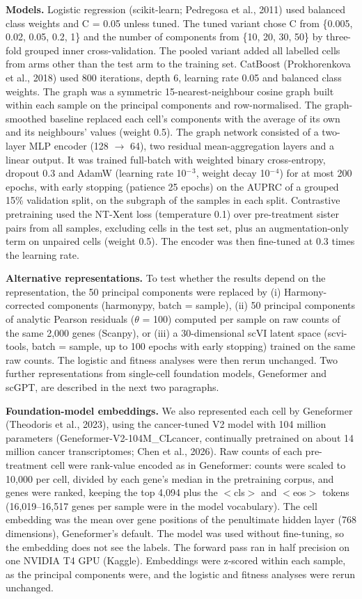 \documentclass[11pt,a4paper]{article}
\begin{document}
\textbf{Models.} Logistic regression (scikit-learn; Pedregosa et al., 2011) used balanced class weights and C = 0.05 unless tuned. The tuned variant chose C from \{0.005, 0.02, 0.05, 0.2, 1\} and the number of components from \{10, 20, 30, 50\} by three-fold grouped inner cross-validation. The pooled variant added all labelled cells from arms other than the test arm to the training set. CatBoost (Prokhorenkova et al., 2018) used 800 iterations, depth 6, learning rate 0.05 and balanced class weights. The graph was a symmetric 15-nearest-neighbour cosine graph built within each sample on the principal components and row-normalised. The graph-smoothed baseline replaced each cell's components with the average of its own and its neighbours' values (weight 0.5). The graph network consisted of a two-layer MLP encoder (128 $\rightarrow$ 64), two residual mean-aggregation layers and a linear output. It was trained full-batch with weighted binary cross-entropy, dropout 0.3 and AdamW (learning rate 10$^-$$^3$, weight decay 10$^-$$^4$) for at most 200 epochs, with early stopping (patience 25 epochs) on the AUPRC of a grouped 15\% validation split, on the subgraph of the samples in each split. Contrastive pretraining used the NT-Xent loss (temperature 0.1) over pre-treatment sister pairs from all samples, excluding cells in the test set, plus an augmentation-only term on unpaired cells (weight 0.5). The encoder was then fine-tuned at 0.3 times the learning rate.

\textbf{Alternative representations.} To test whether the results depend on the representation, the 50 principal components were replaced by (i) Harmony-corrected components (harmonypy, batch = sample), (ii) 50 principal components of analytic Pearson residuals ($\theta$ = 100) computed per sample on raw counts of the same 2,000 genes (Scanpy), or (iii) a 30-dimensional scVI latent space (scvi-tools, batch = sample, up to 100 epochs with early stopping) trained on the same raw counts. The logistic and fitness analyses were then rerun unchanged. Two further representations from single-cell foundation models, Geneformer and scGPT, are described in the next two paragraphs.

\textbf{Foundation-model embeddings.} We also represented each cell by Geneformer (Theodoris et al., 2023), using the cancer-tuned V2 model with 104 million parameters (Geneformer-V2-104M\_CLcancer, continually pretrained on about 14 million cancer transcriptomes; Chen et al., 2026). Raw counts of each pre-treatment cell were rank-value encoded as in Geneformer: counts were scaled to 10,000 per cell, divided by each gene's median in the pretraining corpus, and genes were ranked, keeping the top 4,094 plus the $<$cls$>$ and $<$eos$>$ tokens (16,019--16,517 genes per sample were in the model vocabulary). The cell embedding was the mean over gene positions of the penultimate hidden layer (768 dimensions), Geneformer's default. The model was used without fine-tuning, so the embedding does not see the labels. The forward pass ran in half precision on one NVIDIA T4 GPU (Kaggle). Embeddings were z-scored within each sample, as the principal components were, and the logistic and fitness analyses were rerun unchanged.
\end{document}
